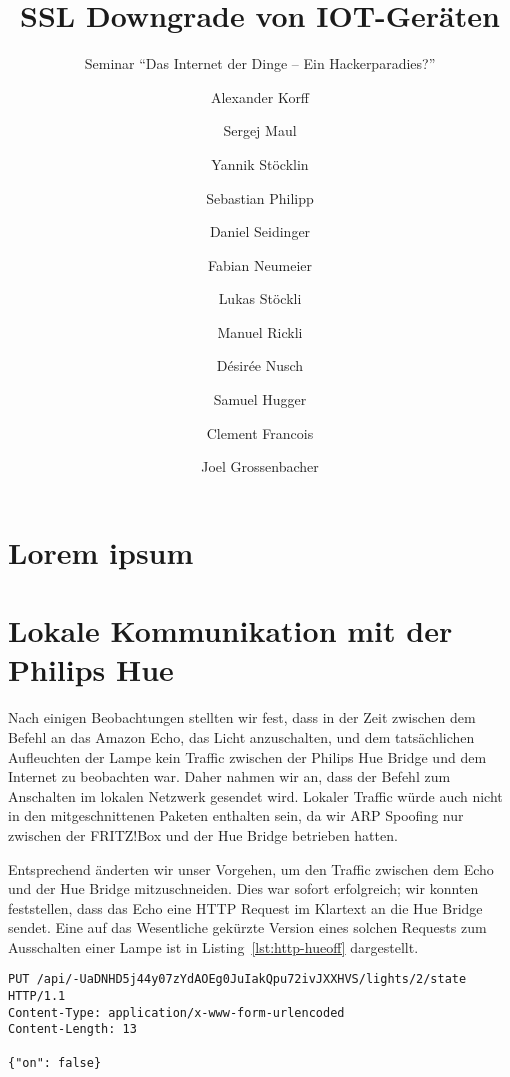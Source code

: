 \documentclass[11pt,a4paper]{scrartcl}
\title{SSL Downgrade von IOT-Geräten}
\subtitle{Seminar ``Das Internet der Dinge -- Ein Hackerparadies?''}
\author{Alexander Korff\and
Sergej Maul\and
Yannik Stöcklin\and
Sebastian Philipp\and
Daniel Seidinger\and
Fabian Neumeier\and
Lukas Stöckli\and
Manuel Rickli\and
Désirée Nusch\and
Samuel Hugger\and
Clement Francois\and
Joel Grossenbacher}
\begin{document}
\maketitle
\section{Lorem ipsum}
\lipsum
\section{Lokale Kommunikation mit der Philips Hue}
Nach einigen Beobachtungen stellten wir fest, dass in der Zeit zwischen dem Befehl an das
Amazon Echo, das Licht anzuschalten, und dem tatsächlichen Aufleuchten der Lampe kein
Traffic zwischen der Philips Hue Bridge und dem Internet zu beobachten war. Daher nahmen wir
an, dass der Befehl zum Anschalten im lokalen Netzwerk gesendet wird. Lokaler Traffic würde
auch nicht in den mitgeschnittenen Paketen enthalten sein, da wir ARP Spoofing nur zwischen
der FRITZ!Box und der Hue Bridge betrieben hatten.

Entsprechend änderten wir unser Vorgehen,
um den Traffic zwischen dem Echo und der Hue Bridge mitzuschneiden. Dies war sofort
erfolgreich; wir konnten feststellen, dass das Echo eine HTTP Request im Klartext an die Hue
Bridge sendet. Eine auf das Wesentliche gekürzte Version eines solchen Requests zum
Ausschalten einer Lampe ist in Listing~\ref{lst:http-hueoff} dargestellt.
\begin{lstlisting}[label={lst:http-hueoff},caption={Ein HTTP Request zum Ausschalten von Lampe Nr. 2.},float,floatplacement=H]
PUT /api/-UaDNHD5j44y07zYdAOEg0JuIakQpu72ivJXXHVS/lights/2/state HTTP/1.1
Content-Type: application/x-www-form-urlencoded
Content-Length: 13

{"on": false}
\end{lstlisting}
\end{document}
